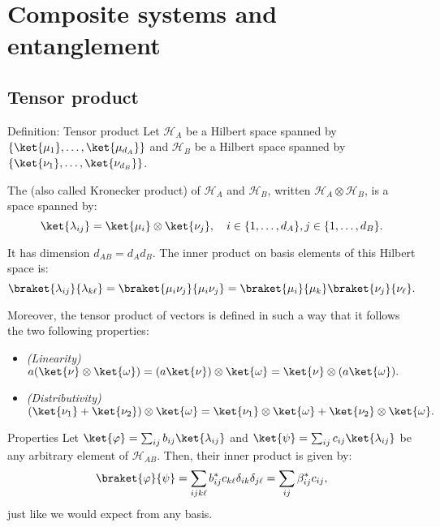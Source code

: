 \documentclass[a4paper]{article}
\begin{document}
\section{Composite systems and entanglement}

\subsection{Tensor product}


\begin{parag}{Definition: Tensor product}
    Let $\mathcal{H}_A$ be a Hilbert space spanned by $\left\{\ket{\mu_1}, \ldots, \ket{\mu_{d_A}}\right\}$ and $\mathcal{H}_B$ be a Hilbert space spanned by $\left\{\ket{\nu_1}, \ldots, \ket{\nu_{d_B}}\right\}$. 

    The  (also called Kronecker product) of $\mathcal{H}_A$ and $\mathcal{H}_B$, written $\mathcal{H}_A \otimes \mathcal{H}_B$, is a space spanned by: 
    \[\ket{\lambda_{ij}} = \ket{\mu_i} \otimes \ket{\nu_j}, \mathspace i \in \left\{1, \ldots, d_A\right\}, j \in \left\{1, \ldots, d_B\right\}.\]

    It has dimension $d_{AB} = d_A d_B$. The inner product on basis elements of this Hilbert space is:
    \[\braket{\lambda_{ij}}{\lambda_{k \ell }} = \braket{\mu_i\nu_j}{\mu_i \nu_j} = \braket{\mu_i}{\mu_k} \braket{\nu_j}{\nu_{\ell }}.\]

    Moreover, the tensor product of vectors is defined in such a way that it follows the two following properties:
    \begin{itemize}
        \item \textit{(Linearity)} $a \left(\ket{\nu} \otimes \ket{\omega}\right) = \left(a \ket{\nu}\right) \otimes \ket{\omega} = \ket{\nu} \otimes \left(a \ket{\omega}\right).$
        \item \textit{(Distributivity)} $\left(\ket{\nu_1} + \ket{\nu_2}\right) \otimes \ket{\omega} = \ket{\nu_1} \otimes \ket{\omega} + \ket{\nu_2} \otimes \ket{\omega}.$
    \end{itemize}

    \begin{subparag}{Properties}
        Let $\ket{\phi} = \sum_{ij} b_{ij} \ket{\lambda_{ij}}$ and $\ket{\psi} = \sum_{ij} c_{ij} \ket{\lambda_{ij}}$ be any arbitrary element of $\mathcal{H}_{AB}$. Then, their inner product is given by: 
        \[\braket{\phi}{\psi} = \sum_{i j k \ell } b_{ij}^* c_{k \ell } \delta_{ik} \delta_{j \ell } = \sum_{ij} \beta_{ij}^* c_{ij},\]
        just like we would expect from any basis.


\end{subparag}
\end{parag}
\end{document}

